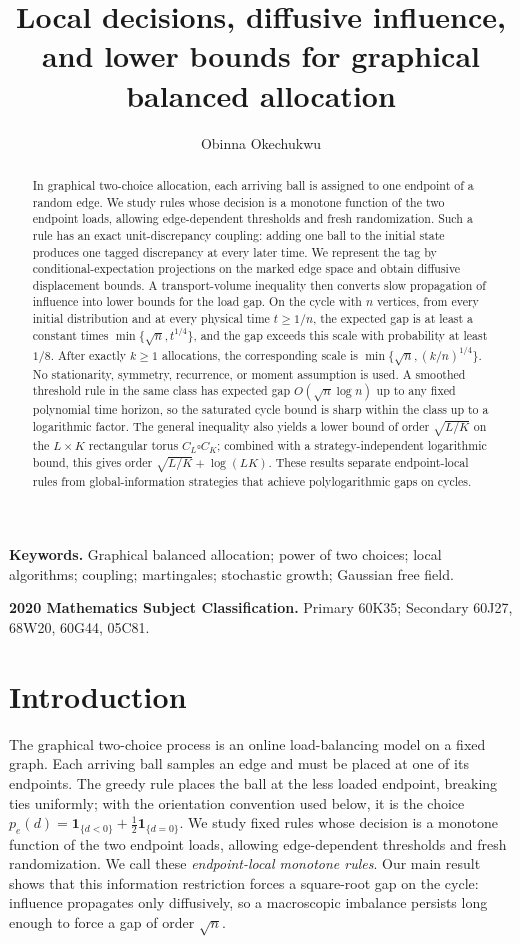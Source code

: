 \documentclass[11pt]{article}
\title{Local decisions, diffusive influence, and lower bounds for graphical balanced allocation}
\author{Obinna Okechukwu}
\date{}
\theoremstyle{remark}
\newcommand{\one}{\mathbf{1}}
\begin{document}
\maketitle

\begin{abstract}
In graphical two-choice allocation, each arriving ball is assigned to one endpoint of a random edge. We study rules whose decision is a monotone function of the two endpoint loads, allowing edge-dependent thresholds and fresh randomization. Such a rule has an exact unit-discrepancy coupling: adding one ball to the initial state produces one tagged discrepancy at every later time. We represent the tag by conditional-expectation projections on the marked edge space and obtain diffusive displacement bounds. A transport-volume inequality then converts slow propagation of influence into lower bounds for the load gap. On the cycle with $n$ vertices, from every initial distribution and at every physical time $t\ge 1/n$, the expected gap is at least a constant times $\min\{\sqrt n,t^{1/4}\}$, and the gap exceeds this scale with probability at least $1/8$. After exactly $k\ge1$ allocations, the corresponding scale is $\min\{\sqrt n,(k/n)^{1/4}\}$. No stationarity, symmetry, recurrence, or moment assumption is used. A smoothed threshold rule in the same class has expected gap $O(\sqrt n\log n)$ up to any fixed polynomial time horizon, so the saturated cycle bound is sharp within the class up to a logarithmic factor. The general inequality also yields a lower bound of order $\sqrt{L/K}$ on the $L\times K$ rectangular torus $C_L\square C_K$; combined with a strategy-independent logarithmic bound, this gives order $\sqrt{L/K}+\log(LK)$. These results separate endpoint-local rules from global-information strategies that achieve polylogarithmic gaps on cycles.
\end{abstract}

\noindent\textbf{Keywords.}
Graphical balanced allocation; power of two choices; local algorithms; coupling; martingales; stochastic growth; Gaussian free field.

\medskip
\noindent\textbf{2020 Mathematics Subject Classification.}
Primary 60K35; Secondary 60J27, 68W20, 60G44, 05C81.

\section{Introduction}

The graphical two-choice process is an online load-balancing model on a fixed graph. Each arriving ball samples an edge and must be placed at one of its endpoints. The greedy rule places the ball at the less loaded endpoint, breaking ties uniformly; with the orientation convention used below, it is the choice $p_e(d)=\one_{\{d<0\}}+\tfrac12\one_{\{d=0\}}$. We study fixed rules whose decision is a monotone function of the two endpoint loads, allowing edge-dependent thresholds and fresh randomization. We call these \emph{endpoint-local monotone rules}. Our main result shows that this information restriction forces a square-root gap on the cycle: influence propagates only diffusively, so a macroscopic imbalance persists long enough to force a gap of order $\sqrt n$.
\end{document}
